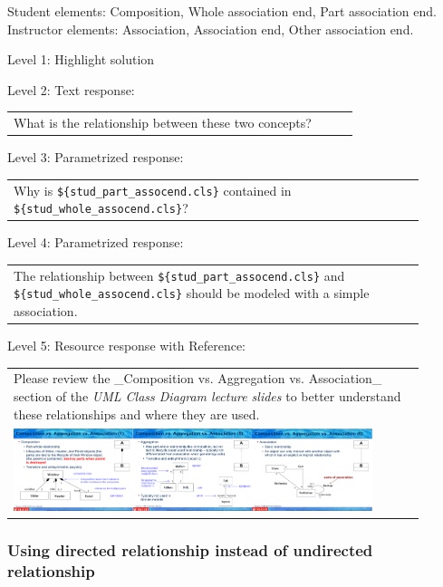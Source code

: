 Student elements: Composition, Whole association end, Part association end. Instructor elements: Association, Association end, Other association end. \medskip

\noindent Level 1: Highlight solution  \medskip

\noindent Level 2: Text response: \medskip

\begin{tabular}{|p{0.9\linewidth}}
What is the relationship between these two concepts?
\end{tabular} \medskip

\noindent Level 3: Parametrized response: \medskip

\begin{tabular}{|p{0.9\linewidth}}
Why is \verb|${stud_part_assocend.cls}| contained in \verb|${stud_whole_assocend.cls}|?
\end{tabular} \medskip

\noindent Level 4: Parametrized response: \medskip

\begin{tabular}{|p{0.9\linewidth}}
The relationship between \verb|${stud_part_assocend.cls}| and \verb|${stud_whole_assocend.cls}| should be modeled with a simple association.
\end{tabular} \medskip

\noindent Level 5: Resource response with Reference: \medskip

\begin{tabular}{|p{0.9\linewidth}}
Please review the _Composition vs. Aggregation vs. Association_ section of 
the \textit{UML Class Diagram lecture slides} to 
better understand these relationships and where they are used.

\\
\includegraphics[width=0.9\textwidth]{images/composition_aggregation_association.png}
\end{tabular} \medskip


\subsubsection{Using directed relationship instead of undirected relationship}

